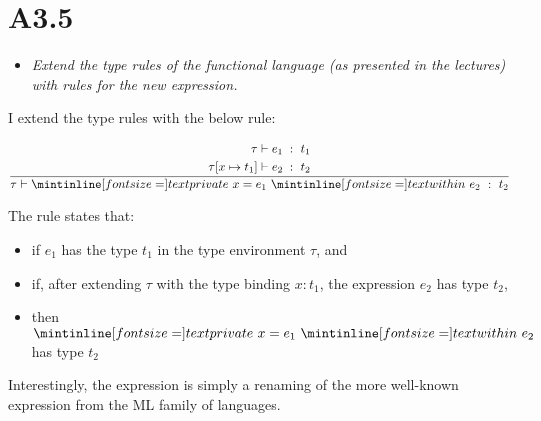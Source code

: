 
\newpage
\section{A3.5}

\begin{itemize}
  \item \emph{Extend the type rules of the functional language (as presented in
    the lectures) with rules for the new  expression.}
\end{itemize}


I extend the type rules with the below rule:

\begin{gather*}
  \frac{
    \begin{aligned}
      \tau          &\vdash e_1 \; :\ t_1\\
      \tau[x \mapsto t_1] &\vdash e_2 \; :\ t_2
    \end{aligned}
  }{\tau \vdash \ms{private }\ x = e_1\ \ms{within } \ e_2\ :\ t_2}
\end{gather*}


The rule states that:
\begin{itemize}
  \item if $e_1$ has the type $t_1$ in the type environment $\tau$, and
  \item if, after extending $\tau$ with the type binding $x : t_1$, the
    expression $e_2$ has type $t_2$,
  \item then $\ms{private }\ x = e_1\ \ms{within } \ e_2$ has type $t_2$
\end{itemize}

Interestingly, the  expression is simply a renaming of the
more well-known  expression from the ML family of languages.

\Sectend
